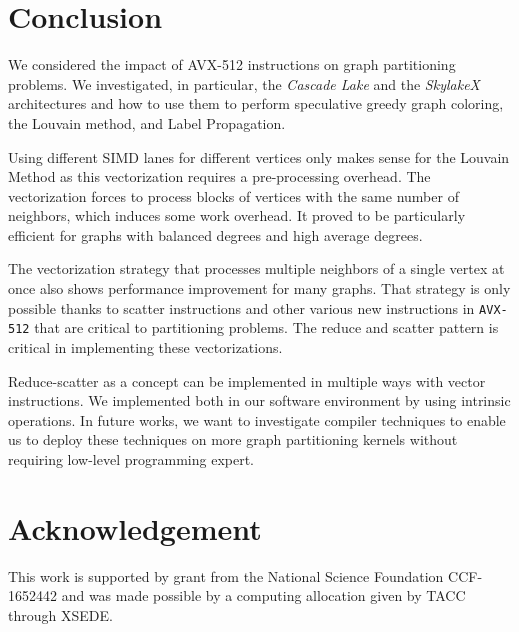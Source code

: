 \documentclass[default,iicol]{sn-jnl}%
\theoremstyle{thmstyleone}%
\theoremstyle{thmstyletwo}%
\theoremstyle{thmstylethree}%
\begin{document}
\section{Conclusion}
We considered the impact of AVX-512 instructions on graph partitioning
problems. We investigated, in particular, the \textit{Cascade Lake}
and the \textit{SkylakeX} architectures and how to use them to perform
speculative greedy graph coloring, the Louvain method, and Label Propagation.

Using different SIMD lanes for different vertices only makes sense for
the Louvain Method as this vectorization requires a pre-processing
overhead. The vectorization forces to process blocks of vertices with
the same number of neighbors, which induces some work overhead. It
proved to be particularly efficient for graphs with balanced degrees
and high average degrees.

The vectorization strategy that processes multiple neighbors of a
single vertex at once also shows performance improvement for many
graphs. That strategy is only possible thanks to scatter instructions
and other various new instructions in \texttt{AVX-512} that are
critical to partitioning problems. The reduce and scatter pattern is
critical in implementing these vectorizations.

Reduce-scatter as a concept can be implemented in multiple ways with
vector instructions. We implemented both in our software environment
by using intrinsic operations. In future works, we want to investigate
compiler techniques to enable us to deploy these techniques on more
graph partitioning kernels without requiring low-level programming expert.

\section*{Acknowledgement}
This work is supported by grant from the National Science Foundation
CCF-1652442 and was made possible by a computing allocation
given by TACC through XSEDE.



%

%
\balance

\end{document}
